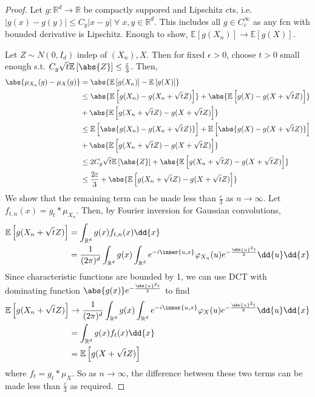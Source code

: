 \begin{proof}
	Let $g : \mathbb{R}^d \to \mathbb{R}$ be compactly suppored and Lipschitz cts, i.e. $|g(x) - g(y)| \leq C_g |x-y| \; \forall \; x, y \in \mathbb{R}^d$.
	This includes all $g \in C_c^\infty$ as any fcn with bounded derivative is Lipschitz.
	Enough to show, $\mathbb{E}[g(X_n)] \to \mathbb{E}[g(X)]$.

	Let $Z \sim N(0, I_d)$ indep of $(X_n), X$.
	Then for fixed $\epsilon > 0$, choose $t > 0$ small enough s.t. $C_g \sqrt t \expect{\abs{Z}} \leq \frac{\varepsilon}{3}$.
	Then,
	\begin{align*}
		\abs{\mu_{X_n}(g) - \mu_X(g)} &= \abs{\expect{g(X_n)} - \expect{g(X)}} \\
		&\leq \abs{\expect{g(X_n) - g(X_n + \sqrt t Z)}} + \abs{\expect{g(X) - g(X + \sqrt t Z)}} \\
		&+ \abs{\expect{g(X_n + \sqrt t Z) - g(X + \sqrt t Z)}} \\
		&\leq \expect{\abs{g(X_n) - g(X_n + \sqrt t Z)}} + \expect{\abs{g(X) - g(X + \sqrt t Z)}} \\
		&+ \abs{\expect{g(X_n + \sqrt t Z) - g(X + \sqrt t Z)}} \\
		&\leq 2 C_g \sqrt t \expect{\abs{Z}} + \abs{\expect{g(X_n + \sqrt t Z) - g(X + \sqrt t Z)}} \\
		&\leq \frac{2\varepsilon}{3} + \abs{\expect{g(X_n + \sqrt t Z) - g(X + \sqrt t Z)}}
	\end{align*}
	We show that the remaining term can be made less than $\frac{\varepsilon}{3}$ as $n \to \infty$.
	Let $f_{t,n}(x) = g_t \ast \mu_{X_n}$.
	Then, by Fourier inversion for Gaussian convolutions,
	\begin{align*}
		\expect{g(X_n + \sqrt t Z)} &= \int_{\mathbb R^d} g(x) f_{t,n}(x) \dd{x} \\
		&= \frac{1}{(2\pi)^d} \int_{\mathbb R^d} g(x) \int_{\mathbb R^d} e^{-i\inner{u,x}} \varphi_{X_n}(u) e^{-\frac{\abs{u}^2 t}{2}} \dd{u} \dd{x}
	\end{align*}
	Since characteristic functions are bounded by 1, we can use DCT with dominating function $\abs{g(x)} e^{-\frac{\abs{u}^2 t}{2}}$ to find
	\begin{align*}
		\expect{g(X_n + \sqrt t Z)} &\to \frac{1}{(2\pi)^d} \int_{\mathbb R^d} g(x) \int_{\mathbb R^d} e^{-i\inner{u,x}} \varphi_X(u) e^{-\frac{\abs{u}^2 t}{2}} \dd{u} \dd{x} \\
		&= \int_{\mathbb R^d} g(x) f_t(x) \dd{x} \\
		&= \expect{g(X + \sqrt t Z)}
	\end{align*}
	where $f_t = g_t \ast \mu_X$.
	So as $n \to \infty$, the difference between these two terms can be made less than $\frac{\varepsilon}{3}$ as required.
\end{proof}

